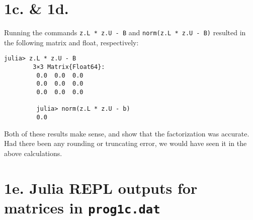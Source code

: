 \documentclass{article}
\begin{document}
    \section*{1c. \& 1d.}
    Running the commands \texttt{z.L * z.U - B} and \texttt{norm(z.L * z.U - B)} resulted in the following matrix and float, respectively:
    \begin{Verbatim}[xleftmargin=4cm]
        julia> z.L * z.U - B
        3×3 Matrix{Float64}:
         0.0  0.0  0.0
         0.0  0.0  0.0
         0.0  0.0  0.0

         julia> norm(z.L * z.U - b)
         0.0
    \end{Verbatim}
    Both of these results make sense, and show that the factorization was accurate. Had there been any rounding or truncating error, we would 
    have seen it in the above calculations.



    \section*{1e. Julia REPL outputs for matrices in \texttt{prog1c.dat}}
\end{document}
